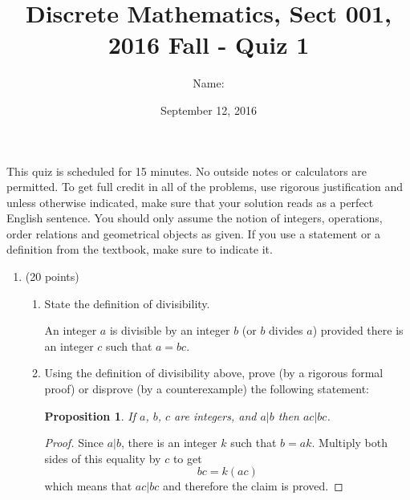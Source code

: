 \documentclass[11pt]{preprint}
\date{September 12, 2016}
\title{Discrete Mathematics, Sect 001, 2016 Fall - Quiz 1}
\author{Name:}
\institute{Courant Institute of Mathematical Sciences, NYU}
\newtheorem*{proposition}{Proposition}
\begin{document}
\maketitle

This quiz is scheduled for 15 minutes. No outside notes or calculators are permitted. To get full credit  in all of the problems, use rigorous justification and unless otherwise indicated, make sure that your solution reads as a perfect English sentence. You should only assume the notion of integers, operations, order relations and geometrical objects as given. If you use a statement or a definition from the textbook, make sure to indicate it.
\vspace{0.2cm}

\begin{enumerate}
\item (20 points)
\begin{enumerate}
\item State the definition of divisibility.

\vspace{1cm}

An integer $a$ is divisible by an integer $b$ (or $b$ divides $a$) provided there is an integer $c$ such that $a = bc$.
\vspace{1cm}
\item Using the definition of divisibility above, prove (by a rigorous formal proof) or disprove (by a counterexample) the following statement:
\begin{proposition}
If $a$, $b$, $c$ are integers, and $a|b$ then $ac|bc$.
\end{proposition}
\begin{proof}
Since $a|b$, there is an integer $k$ such that $b=ak$. Multiply both sides of this equality by $c$ to get
\[
bc=k(ac)
\]
which means that $ac|bc$ and therefore the claim is proved.
\end{proof}
\end{enumerate}
\end{enumerate}
\end{document}
